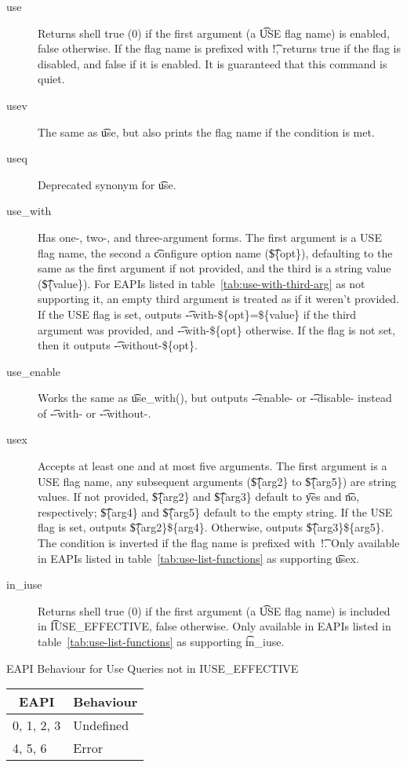 \begin{description}
\item[use] Returns shell true (0) if the first argument (a \t{USE} flag name) is enabled, false
    otherwise.  If the flag name is prefixed with \t{!}, returns true if the flag is disabled, and
    false if it is enabled. It is guaranteed that this command is quiet.
\item[usev] The same as \t{use}, but also prints the flag name if the condition
    is met.
\item[useq] Deprecated synonym for \t{use}.
\item[use\_with]  Has one-, two-, and three-argument forms. The first
    argument is a USE flag name, the second a \t{configure} option name (\t{\$\{opt\}}), defaulting
    to the same as the first argument if not provided, and the third is a string value
    (\t{\$\{value\}}). For EAPIs listed in table~\ref{tab:use-with-third-arg} as not supporting it,
    an empty third argument is treated as if it weren't provided. If the USE flag is set, outputs
    \t{-{}-with-\$\{opt\}=\$\{value\}} if the third argument was provided, and
    \t{-{}-with-\$\{opt\}} otherwise. If the flag is not set, then it outputs
    \t{-{}-without-\$\{opt\}}.
\item[use\_enable] Works the same as \t{use\_with()}, but outputs \t{-{}-enable-} or
    \t{-{}-disable-} instead of \t{-{}-with-} or \t{-{}-without-}.
\item[usex]  Accepts at least one and at most five arguments. The first argument
    is a USE flag name, any subsequent arguments (\t{\$\{arg2\}} to \t{\$\{arg5\}}) are string
    values. If not provided, \t{\$\{arg2\}} and \t{\$\{arg3\}} default to \t{yes} and \t{no},
    respectively; \t{\$\{arg4\}} and \t{\$\{arg5\}} default to the empty string. If the USE flag is
    set, outputs \t{\$\{arg2\}\$\{arg4\}}. Otherwise, outputs \t{\$\{arg3\}\$\{arg5\}}.
    The condition is inverted if the flag name is prefixed with~\t{!}.
    Only available in EAPIs listed in table~\ref{tab:use-list-functions} as supporting \t{usex}.
\item[in\_iuse]  Returns shell true (0) if the first argument (a \t{USE} flag
    name) is included in \t{IUSE\_EFFECTIVE}, false otherwise. Only available in EAPIs listed in
    table~\ref{tab:use-list-functions} as supporting \t{in\_iuse}.
\end{description}

\begin{centertable}{EAPI Behaviour for Use Queries not in IUSE\_EFFECTIVE}
    \label{tab:use-list-strictness}
    \begin{tabular}{ll}
      \toprule
      \multicolumn{1}{c}{\textbf{EAPI}} &
      \multicolumn{1}{c}{\textbf{Behaviour}} \\
      \midrule
      0, 1, 2, 3        & Undefined \\
      4, 5, 6           & Error     \\
      \bottomrule
    \end{tabular}
\end{centertable}

